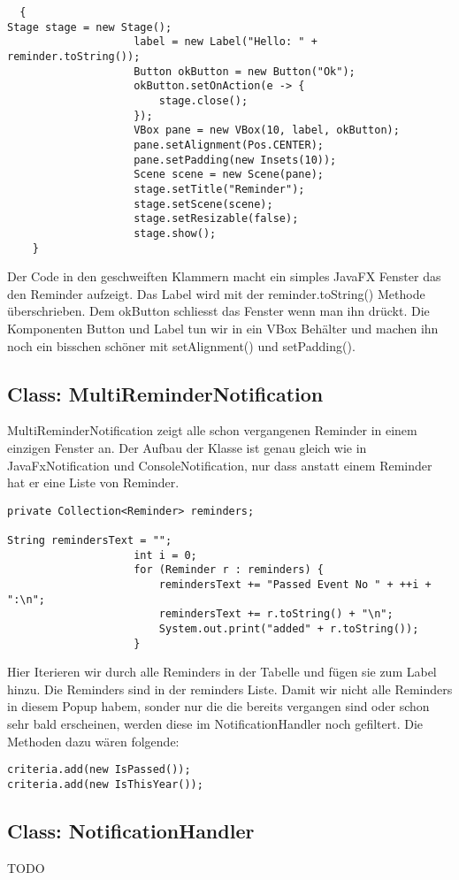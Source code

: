 \begin{lstlisting}
  {
Stage stage = new Stage();
                    label = new Label("Hello: " + reminder.toString());
                    Button okButton = new Button("Ok");
                    okButton.setOnAction(e -> {
                        stage.close();
                    });
                    VBox pane = new VBox(10, label, okButton);
                    pane.setAlignment(Pos.CENTER);
                    pane.setPadding(new Insets(10));
                    Scene scene = new Scene(pane);
                    stage.setTitle("Reminder");
                    stage.setScene(scene);
                    stage.setResizable(false);
                    stage.show();
    }
\end{lstlisting}
Der Code in den geschweiften Klammern macht ein simples JavaFX Fenster das den Reminder aufzeigt. Das Label wird mit der reminder.toString() Methode überschrieben. Dem okButton schliesst das Fenster wenn man ihn drückt. Die Komponenten Button und Label tun wir in ein VBox Behälter und machen ihn noch ein bisschen schöner mit setAlignment() und setPadding().


\subsection{Class: MultiReminderNotification}
MultiReminderNotification zeigt alle schon vergangenen Reminder in einem einzigen Fenster an. Der Aufbau der Klasse ist genau gleich wie in JavaFxNotification und ConsoleNotification, nur dass anstatt einem Reminder hat er eine Liste von Reminder.
\begin{lstlisting}
private Collection<Reminder> reminders;

String remindersText = "";
                    int i = 0;
                    for (Reminder r : reminders) {
                        remindersText += "Passed Event No " + ++i + ":\n";
                        remindersText += r.toString() + "\n";
                        System.out.print("added" + r.toString());
                    }
\end{lstlisting}
Hier Iterieren wir durch alle Reminders in der Tabelle und fügen sie zum Label hinzu. Die Reminders sind in der reminders Liste. Damit wir nicht alle Reminders in diesem Popup habem, sonder nur die die bereits vergangen sind oder schon sehr bald erscheinen, werden diese im NotificationHandler noch gefiltert.
Die Methoden dazu wären folgende:
\begin{lstlisting}
criteria.add(new IsPassed());
criteria.add(new IsThisYear());
\end{lstlisting}

\subsection{Class: NotificationHandler}
TODO
